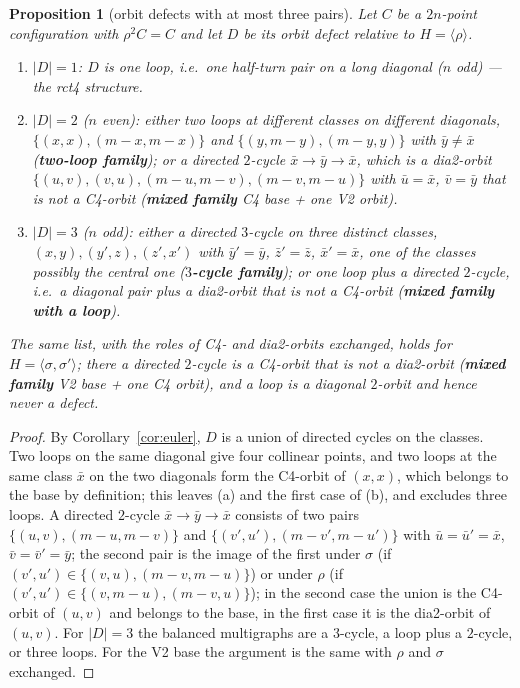\documentclass[11pt]{article}
\newtheorem{proposition}[lemma]{Proposition}
\theoremstyle{remark}
\newcommand{\rot}{\rho}
\begin{document}
\begin{proposition}[orbit defects with at most three pairs]\label{prop:small}
Let $C$ be a $2n$-point configuration with $\rot^2C=C$ and let $D$ be its orbit defect relative to $H=\langle\rot\rangle$.
\begin{enumerate}
\item[(a)] $|D|=1$: $D$ is one loop, i.e.\ one half-turn pair on a long diagonal ($n$ odd) --- the rct4 structure.
\item[(b)] $|D|=2$ ($n$ even): either two loops at different classes on different diagonals, $\{(x,x),(m-x,m-x)\}$ and
 $\{(y,m-y),(m-y,y)\}$ with $\bar y\ne\bar x$ (\textbf{two-loop family}); or a directed $2$-cycle $\bar x\to\bar y\to\bar x$,
 which is a dia2-orbit $\{(u,v),(v,u),(m-u,m-v),(m-v,m-u)\}$ with $\bar u=\bar x$, $\bar v=\bar y$ that is not a C4-orbit
 (\textbf{mixed family} C4 base + one V2 orbit).
\item[(c)] $|D|=3$ ($n$ odd): either a directed $3$-cycle on three distinct classes, $(x,y),(y',z),(z',x')$ with
 $\bar y'=\bar y$, $\bar z'=\bar z$, $\bar x'=\bar x$, one of the classes possibly the central one (\textbf{$3$-cycle family});
 or one loop plus a directed $2$-cycle, i.e.\ a diagonal pair plus a dia2-orbit that is not a C4-orbit (\textbf{mixed family
 with a loop}).
\end{enumerate}
The same list, with the roles of C4- and dia2-orbits exchanged, holds for $H=\langle\sigma,\sigma'\rangle$; there a directed
$2$-cycle is a C4-orbit that is not a dia2-orbit (\textbf{mixed family} V2 base + one C4 orbit), and a loop is a diagonal
$2$-orbit and hence never a defect.
\end{proposition}
\begin{proof}
By Corollary~\ref{cor:euler}, $D$ is a union of directed cycles on the classes.  Two loops on the same diagonal give four
collinear points, and two loops at the same class $\bar x$ on the two diagonals form the C4-orbit of $(x,x)$, which belongs to
the base by definition; this leaves (a) and the first case of (b), and excludes three loops.  A directed $2$-cycle
$\bar x\to\bar y\to\bar x$ consists of two pairs $\{(u,v),(m-u,m-v)\}$ and $\{(v',u'),(m-v',m-u')\}$ with $\bar u=\bar u'=\bar x$,
$\bar v=\bar v'=\bar y$; the second pair is the image of the first under $\sigma$ (if $(v',u')\in\{(v,u),(m-v,m-u)\}$) or
under $\rot$ (if $(v',u')\in\{(v,m-u),(m-v,u)\}$); in the second case the union is the C4-orbit of $(u,v)$ and belongs to the
base, in the first case it is the dia2-orbit of $(u,v)$.  For $|D|=3$ the balanced multigraphs are a $3$-cycle, a loop plus a
$2$-cycle, or three loops.  For the V2 base the argument is the same with $\rot$ and $\sigma$ exchanged.
\end{proof}
\end{document}
